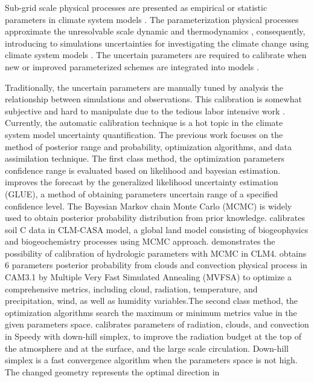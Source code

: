 \documentclass[gmd, manuscript]{copernicus}
\begin{document}
Sub-grid scale physical processes are presented as empirical or statistic
parameters in climate system models \citep{hack1994climate}.  The
parameterization physical processes approximate the unresolvable scale dynamic
and thermodynamics \citep{williams2005modelling},
consequently, introducing to simulations uncertainties for investigating the
climate change using climate system models \citep{warren1979seasonal}. The
uncertain parameters are required to calibrate when new or improved
parameterized schemes are integrated into models \citep{li2013evaluation}. 

Traditionally, the uncertain parameters are manually tuned by analysis the relationship between
simulations and observations. This calibration is somewhat subjective and hard to manipulate due to
the tedious labor intensive work \citep{hakkarainen2012closure,allen2000quantifying}. Currently,
the automatic calibration technique is a hot topic in the climate system model uncertainty
quantification. The previous work focuses on the method of posterior range and probability,
optimization algorithms, and data assimilation technique. The first class method, the optimization
parameters confidence range is evaluated based on likelihood and bayesian estimation.
\cite{cameron1999flood} improves the forecast by the generalized likelihood uncertainty estimation
(GLUE), a method of obtaining parameters uncertain range of a specified confidence level. The
Bayesian Markov chain Monte Carlo (MCMC) is widely used to obtain posterior probability
distribution from prior knowledge. \cite{hararuk2014evaluation} calibrates soil C data in CLM-CASA
model, a global land model consisting of biogeophysics and biogeochemistry processes using MCMC
approach. \cite{sun2013inverse} demonstrates the possibility of calibration of hydrologic 
parameters with  MCMC in CLM4. \cite{jackson2008error} obtains 6 parameters posterior probability 
from clouds and convection physical process in CAM3.1 by Multiple Very Fast  Simulated Annealing 
(MVFSA) to optimize a comprehensive metrics, including  cloud, radiation, temperature,  and
precipitation, wind, as  well as humidity variables.The second class method, the optimization
algorithms search the maximum or minimum metrics value in the given parameters
space.\cite{severijns2005optimizing} calibrates parameters of radiation,  clouds, and convection in
Speedy with down-hill simplex, to improve the radiation budget at the top of the atmosphere and at
the surface, and the  large scale circulation. Down-hill simplex is a fast convergence algorithm
when the parameters space is not high. The changed geometry represents the optimal direction in 
\end{document}
